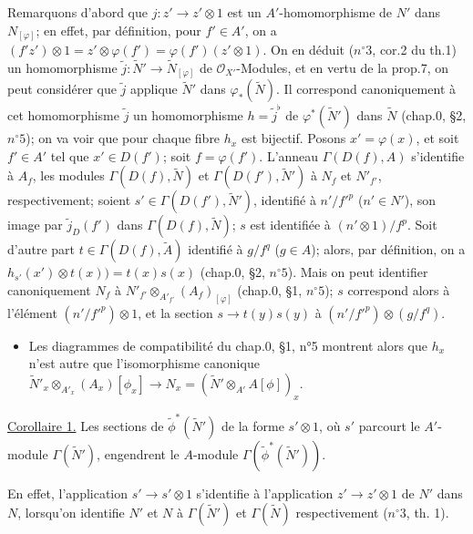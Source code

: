 \noindent Remarquons d'abord que $j: z' \to z' \otimes 1$ est un $A'$-homomorphisme de $N'$ dans $N_{[\varphi]}$; en effet, par définition, pour $f' \in A'$, on a $(f'z') \otimes 1 = z' \otimes \varphi(f') = \varphi(f')(z' \otimes 1)$. On en déduit ($n^{\circ}3$, cor.2 du th.1) un homomorphisme $\tilde{j}: \tilde{N}' \to \tilde{N}_{[\varphi]}$ de $\mathcal{O}_{X'}$-Modules, et en vertu de la prop.7, on peut considérer que $\tilde{j}$ applique $\tilde{N}'$ dans $\varphi_*(\tilde{N})$. Il correspond canoniquement à cet homomorphisme $\tilde{j}$ un homomorphisme $h = \tilde{j}^{\flat}$ de $\varphi^*(\tilde{N}')$ dans $\tilde{N}$ (chap.0, §2, $n^{\circ}5$); on va voir que pour chaque fibre $h_x$ est bijectif. Posons $x' = \varphi(x)$, et soit $f' \in A'$ tel que $x' \in D(f')$; soit $f = \varphi(f')$. L'anneau $\Gamma(D(f), A)$ s'identifie à $A_f$, les modules $\Gamma(D(f), \tilde{N})$ et $\Gamma(D(f'), \tilde{N}')$ à $N_f$ et $N'_{f'}$, respectivement; soient $s' \in \Gamma(D(f'), \tilde{N}')$, identifié à $n'/f'^p$ ($n' \in N'$), son image par $\tilde{j}_D(f')$ dans $\Gamma(D(f), \tilde{N})$; $s$ est identifiée à $(n' \otimes 1)/f^p$. Soit d'autre part $t \in \Gamma(D(f), \tilde{A})$ identifié à $g/f^q$ ($g \in A$); alors, par définition, on a $h_{s'}(x') \otimes t(x)) = t(x)s(x)$ (chap.0, §2, $n^{\circ}5$). Mais on peut identifier canoniquement $N_f$ à $N'_{f'} \otimes_{A'_{f'}} (A_f)_{[\varphi]}$ (chap.0, §1, $n^{\circ}5$); $s$ correspond alors à l'élément $(n'/f'^p) \otimes 1$, et la section $s \to t(y)s(y)$ à $(n'/f'^p) \otimes (g/f^q)$.

\newpage


\begin{itemize}
\item[] Les diagrammes de compatibilité du chap.0, §1, n°5 montrent alors que $h_x$ n'est autre que l'isomorphisme canonique $\tilde{N}'_x \otimes_{A'_x} (A_x)[\phi_x] \to N_x = (\tilde{N}' \otimes_{A'} A[\phi])_x$.
\end{itemize}

\noindent \underline{Corollaire 1.} Les sections de $\tilde{\phi}^*(\tilde{N}')$ de la forme $s' \otimes 1$, où $s'$ parcourt le $A'$-module $\Gamma(\tilde{N}')$, engendrent le $A$-module $\Gamma(\tilde{\phi}^*(\tilde{N}'))$.

\noindent En effet, l'application $s' \to s' \otimes 1$ s'identifie à l'application $z' \to z' \otimes 1$ de $N'$ dans $N$, lorsqu'on identifie $N'$ et $N$ à $\Gamma(\tilde{N}')$ et $\Gamma(\tilde{N})$ respectivement ($n^\circ 3$, th. 1).

